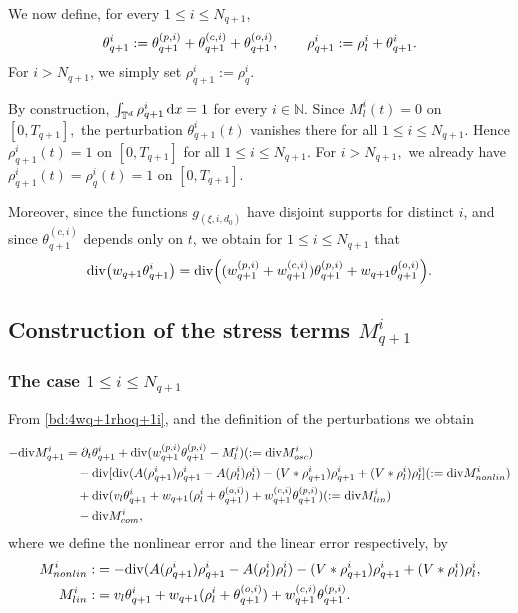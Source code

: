 \documentclass[UTF-8,reqno]{amsart}
\numberwithin{equation}{section}
\theoremstyle{definition}
\def\dif{{\mathord{{\rm d}}}}
\def\leq{\leqslant}
\def\div{\mathord{{\rm div}}}
\def\dif{{\mathord{{\rm d}}}}
\def\leq{\leqslant}
\def\div{\mathord{{\rm div}}}
\begin{document}
We now define, for every $1\leq i\leq N_{q+1}$,
\begin{align}
\theta_{q+1}^i
:=
\theta_{q+1}^{(p,i)}
+
\theta_{q+1}^{(c,i)}
+
\theta_{q+1}^{(o,i)},
\qquad
\rho_{q+1}^i
:=
\rho_l^i+\theta_{q+1}^i.
\notag
\end{align}
For $i>N_{q+1}$, we simply set
$
\rho_{q+1}^i:=\rho_q^i.
$

By construction,
$
\int_{\mathbb{T}^d}\rho_{q+1}^i\,\dif x=1
$
for every $i\in\mathbb{N}$.
Since
$
M_l^i(t)=0
$
on
$
[0,T_{q+1}],
$
the perturbation $\theta_{q+1}^i(t)$ vanishes there for all
$
1\leq i\leq N_{q+1}.
$
Hence
$
\rho_{q+1}^i(t)=1
$
on
$
[0,T_{q+1}]
$
for all
$
1\leq i\leq N_{q+1}.
$
For
$
i>N_{q+1},
$
we already have
$
\rho_{q+1}^i(t)
=
\rho_q^i(t)
=
1
$
on
$
[0,T_{q+1}].
$

Moreover, since the functions
$
g_{(\xi,i,d_0)}
$
have disjoint supports for distinct $i$, and since
$
\theta_{q+1}^{(c,i)}
$
depends only on $t$, we obtain for
$
1\leq i\leq N_{q+1}
$
that
\begin{align}
\div\bigl(
w_{q+1}\theta_{q+1}^i
\bigr)
=
\div\Bigl(
(w_{q+1}^{(p,i)}+w_{q+1}^{(c,i)})
\theta_{q+1}^{(p,i)}
+
w_{q+1}\theta_{q+1}^{(o,i)}
\Bigr).
\label{bd:4wq+1rhoq+1i}
\end{align}

 


\subsection{Construction of the stress terms $M^{i}_{q+1}$}\label{sec:4defmq+1}

\subsubsection{The case $1\leq i\leq N_{q+1}$} 
From \eqref{bd:4wq+1rhoq+1i}, and the definition of the perturbations 
we obtain

\begin{align*}
 -\div M^{i}_{q+1}&=\partial_t\theta_{q+1}^i+\div (w_{q+1}^{(p,i)}\theta_{q+1}^{(p,i)}-M^{i}_l)(:=\div M^{i}_{osc})\\
 &\quad-\div[ \div( A(\rho^{i}_{q+1})\rho^{i}_{q+1}-A(\rho^{i}_{l}) \rho^{i}_{l})-(V*\rho_{q+1}^i)\rho_{q+1}^i+(V*\rho_{l}^i)\rho_{l}^i](:=\div M^{i}_{nonlin})\notag\\ 
 &\quad+\div(v_l\theta^{i}_{q+1}+w_{q+1}(\rho^{i}_l+\theta_{q+1}^{(o,i)})+w_{q+1}^{(c,i)}\theta_{q+1}^{(p,i)})(:=\div M^{i}_{lin})\\
&\quad -\div M_{com}^i,
\end{align*}
where we define the nonlinear error and the linear error  respectively, by
\begin{align*} 
M^{i}_{nonlin}:&= -\div( A(\rho^{i}_{q+1}) \rho^{i}_{q+1}-A(\rho^{i}_{l}) \rho^{i}_{l} )-(V*\rho_{q+1}^i)\rho_{q+1}^i+(V*\rho_{l}^i)\rho_{l}^i,\\
M^{i}_{lin}:&=v_l\theta^{i}_{q+1}+w_{q+1}(\rho^{i}_l+\theta_{q+1}^{(o,i)}) +w_{q+1}^{(c,i)}\theta_{q+1}^{(p,i)}.
\end{align*}
\end{document}
